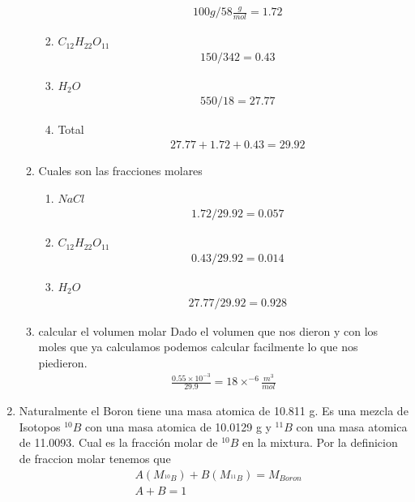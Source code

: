 \documentclass[12pt]{exam}
\begin{document}
\begin{enumerate}
\begin{enumerate}
\begin{enumerate}
						\begin{align*}
							& 100 g/58 \frac{g}{mol} = 1.72
						\end{align*}
					\item $C_{12}H_{22}O_{11}$
						\begin{align*}
							& 150/342 = 0.43
						\end{align*}
					\item $H_2O$
						\begin{align*}
							& 550/18 = 27.77
						\end{align*}
					\item Total
						\begin{align*}
							& 27.77 + 1.72 + 0.43 = 29.92
						\end{align*}
				\end{enumerate}
			\item Cuales son las fracciones molares
				\begin{enumerate}
					\item $NaCl$
						\begin{align*}
							& 1.72/29.92 = 0.057
						\end{align*}
					\item $C_{12}H_{22}O_{11}$
						\begin{align*}
							& 0.43/29.92 = 0.014
						\end{align*}
					\item $H_2O$
						\begin{align*}
							& 27.77/29.92 = 0.928
						\end{align*}
				\end{enumerate}
			\item calcular el volumen molar
				Dado el volumen que nos dieron y con los moles que ya calculamos podemos calcular facilmente lo que nos piedieron.
				\begin{align*}
					\frac{0.55\times10^{-3}}{29.9}=18\times^{-6} \frac{m^3}{mol}
				\end{align*}
		\end{enumerate}
	\item Naturalmente el Boron tiene una masa atomica de 10.811 g. Es una mezcla de Isotopos $^{10}B$ con una masa atomica de 10.0129 g y $^{11}B$ con una masa atomica de 11.0093. Cual es la fracción molar de $^{10}B$ en la mixtura.
		Por la definicion de fraccion molar tenemos que 
		\begin{align*}
			&A(M_{^{10}B}) + B(M_{^{11}B}) = M_{Boron}\\
			&A + B = 1\\

\end{align*}
\end{enumerate}
\end{document}
